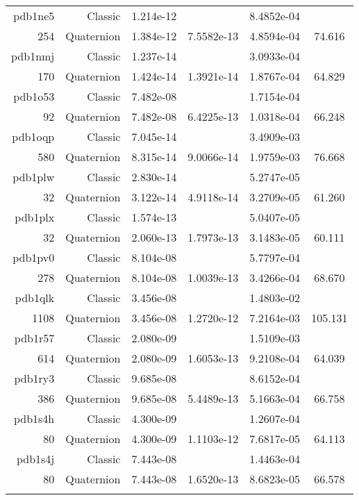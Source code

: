 \begin{xltabular}{\textwidth}{r|rS[table-format=1.3e+2]S[table-format=1.4e+2]S[table-format=1.4e+2]S[table-format=-1.3]}
pdb1ne5 & Classic & 1.214e-12 &  & 8.4852e-04 & \\
254 & Quaternion & 1.384e-12 & 7.5582e-13 & 4.8594e-04 & 74.616\\  \addlinespace
pdb1nmj & Classic & 1.237e-14 &  & 3.0933e-04 & \\
170 & Quaternion & 1.424e-14 & 1.3921e-14 & 1.8767e-04 & 64.829\\  \addlinespace
pdb1o53 & Classic & 7.482e-08 &  & 1.7154e-04 & \\
92 & Quaternion & 7.482e-08 & 6.4225e-13 & 1.0318e-04 & 66.248\\  \addlinespace
pdb1oqp & Classic & 7.045e-14 &  & 3.4909e-03 & \\
580 & Quaternion & 8.315e-14 & 9.0066e-14 & 1.9759e-03 & 76.668\\  \addlinespace
pdb1plw & Classic & 2.830e-14 &  & 5.2747e-05 & \\
32 & Quaternion & 3.122e-14 & 4.9118e-14 & 3.2709e-05 & 61.260\\  \addlinespace
pdb1plx & Classic & 1.574e-13 &  & 5.0407e-05 & \\
32 & Quaternion & 2.060e-13 & 1.7973e-13 & 3.1483e-05 & 60.111\\  \addlinespace
pdb1pv0 & Classic & 8.104e-08 &  & 5.7797e-04 & \\
278 & Quaternion & 8.104e-08 & 1.0039e-13 & 3.4266e-04 & 68.670\\  \addlinespace
pdb1qlk & Classic & 3.456e-08 &  & 1.4803e-02 & \\
1108 & Quaternion & 3.456e-08 & 1.2720e-12 & 7.2164e-03 & 105.131\\  \addlinespace
pdb1r57 & Classic & 2.080e-09 &  & 1.5109e-03 & \\
614 & Quaternion & 2.080e-09 & 1.6053e-13 & 9.2108e-04 & 64.039\\  \addlinespace
pdb1ry3 & Classic & 9.685e-08 &  & 8.6152e-04 & \\
386 & Quaternion & 9.685e-08 & 5.4489e-13 & 5.1663e-04 & 66.758\\  \addlinespace
pdb1s4h & Classic & 4.300e-09 &  & 1.2607e-04 & \\
80 & Quaternion & 4.300e-09 & 1.1103e-12 & 7.6817e-05 & 64.113\\  \addlinespace
pdb1s4j & Classic & 7.443e-08 &  & 1.4463e-04 & \\
80 & Quaternion & 7.443e-08 & 1.6520e-13 & 8.6823e-05 & 66.578\\  \addlinespace

\end{xltabular}
